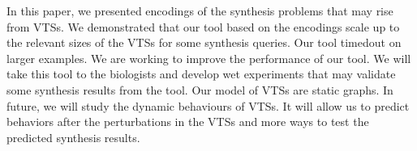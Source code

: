 In this paper, we presented encodings of the synthesis problems
that may rise from VTSs.
%
We demonstrated that our tool based on the encodings
scale up to the relevant sizes of the VTSs for some synthesis queries.
%
Our tool timedout on larger examples.
%
We are working to improve the performance of our tool.
%
We will take this tool to the biologists and develop wet experiments 
that may validate some synthesis results from the tool.
%
Our model of VTSs are static graphs.
%
In future, we will study the dynamic behaviours of VTSs.
%
It will allow us to predict behaviors after the perturbations in the VTSs
and more ways to test the predicted synthesis results.

